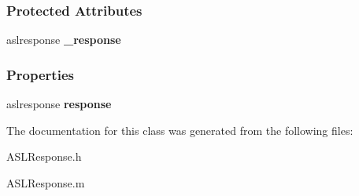 \subsubsection*{Protected Attributes}
\begin{DoxyCompactItemize}
\item 
\hypertarget{interface_a_s_l_response_a7865258709bb85f9a1945b2f088a9285}{
aslresponse {\bfseries \_\-response}}
\label{interface_a_s_l_response_a7865258709bb85f9a1945b2f088a9285}

\end{DoxyCompactItemize}
\subsubsection*{Properties}
\begin{DoxyCompactItemize}
\item 
\hypertarget{interface_a_s_l_response_a61c2482ba34e895715ac5ae33bf3a633}{
aslresponse {\bfseries response}}
\label{interface_a_s_l_response_a61c2482ba34e895715ac5ae33bf3a633}

\end{DoxyCompactItemize}


The documentation for this class was generated from the following files:\begin{DoxyCompactItemize}
\item 
ASLResponse.h\item 
ASLResponse.m\end{DoxyCompactItemize}
